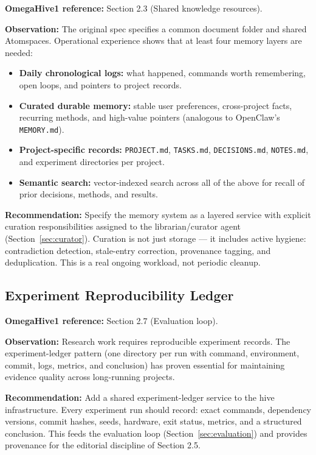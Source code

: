 \documentclass[11pt,a4paper]{article}
\begin{document}
\textbf{OmegaHive1 reference:} Section 2.3 (Shared knowledge resources).

\textbf{Observation:} The original spec specifies a common document folder
and shared Atomspaces. Operational experience shows that at least four
memory layers are needed:

\begin{itemize}[nosep]
  \item \textbf{Daily chronological logs:} what happened, commands worth
    remembering, open loops, and pointers to project records.
  \item \textbf{Curated durable memory:} stable user preferences,
    cross-project facts, recurring methods, and high-value pointers
    (analogous to OpenClaw's \texttt{MEMORY.md}).
  \item \textbf{Project-specific records:} \texttt{PROJECT.md},
    \texttt{TASKS.md}, \texttt{DECISIONS.md}, \texttt{NOTES.md}, and
    experiment directories per project.
  \item \textbf{Semantic search:} vector-indexed search across all of the
    above for recall of prior decisions, methods, and results.
\end{itemize}

\textbf{Recommendation:} Specify the memory system as a layered service
with explicit curation responsibilities assigned to the librarian/curator
agent (Section~\ref{sec:curator}). Curation is not just storage --- it
includes active hygiene: contradiction detection, stale-entry correction,
provenance tagging, and deduplication. This is a real ongoing workload,
not periodic cleanup.

\subsection{Experiment Reproducibility Ledger}
\label{sec:experiment-ledger}

\textbf{OmegaHive1 reference:} Section 2.7 (Evaluation loop).

\textbf{Observation:} Research work requires reproducible experiment records.
The experiment-ledger pattern (one directory per run with command,
environment, commit, logs, metrics, and conclusion) has proven essential
for maintaining evidence quality across long-running projects.

\textbf{Recommendation:} Add a shared experiment-ledger service to the hive
infrastructure. Every experiment run should record: exact commands,
dependency versions, commit hashes, seeds, hardware, exit status, metrics,
and a structured conclusion. This feeds the evaluation loop
(Section~\ref{sec:evaluation}) and provides provenance for the editorial
discipline of Section 2.5.
\end{document}
